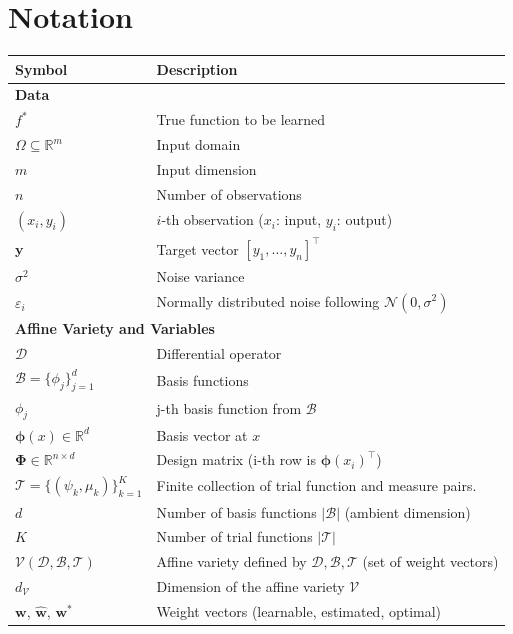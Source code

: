 \documentclass{article}
\theoremstyle{plain}
\theoremstyle{definition}
\theoremstyle{remark}
\begin{document}
\section{Notation}
\label{app:notation}
\begin{table}[!htbp]
\centering
\begin{tabular}{ll}
\textbf{Symbol} & \textbf{Description} \\
\midrule
\multicolumn{2}{l}{\vspace{0.02in} \textbf{Data}} \\
$f^*$ & True function to be learned \\
$\Omega \subseteq \mathbb{R}^m$ & Input domain \\
$m$ & Input dimension \\
$n$ & Number of observations \\
$(x_i, y_i)$ &  $i$-th observation ($x_i$: input, $y_i$: output) \\
$\boldsymbol{y}$ & Target vector $[y_1, \dots, y_n]^\top$ \\
$\sigma^2$ & Noise variance \\
$\varepsilon_i$ & Normally distributed noise following $\mathcal{N}(0, \sigma^2)$ \\
\midrule
\multicolumn{2}{l}{\vspace{0.02in} \textbf{Affine Variety and Variables}} \\
$\mathscr{D}$ & Differential operator \\
$\mathcal{B} = \{\phi_j\}_{j=1}^d$ & Basis functions \\
$\phi_j$ & j-th basis function from $\mathcal{B}$ \\
$\bm{\phi}(x) \in \mathbb{R}^d$ & Basis vector at $x$ \\
$\mathbf{\Phi} \in \mathbb{R}^{n \times d}$ & Design matrix (i-th row is $\boldsymbol{\phi}(x_i)^\top$) \\
$\mathcal{T} = \{(\psi_k, \mu_k)\}_{k=1}^K$ & Finite collection of trial function and measure pairs. \\
$d$ & Number of basis functions $|\mathcal{B}|$ (ambient dimension) \\
$K$ & Number of trial functions $|\mathcal{T}|$ \\
$\mathcal{V}(\mathscr{D}, \mathcal{B}, \mathcal{T})$ & Affine variety defined by $\mathscr{D}, \mathcal{B}, \mathcal{T}$ (set of weight vectors) \\
$d_{\mathcal{V}}$ & Dimension of the affine variety $\mathcal{V}$ \\
$\bm{w}$, $\hat{\bm{w}}$, $\bm{w}^*$ & Weight vectors (learnable, estimated, optimal) \\

\end{tabular}
\end{table}
\end{document}
